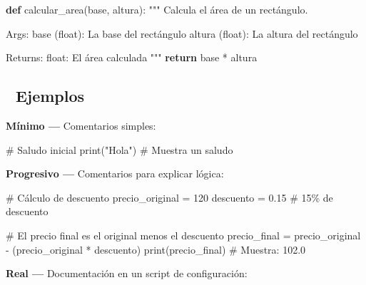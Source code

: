 \documentclass[
  doc,
  floatsintext,
  longtable,
  a4paper,
  nolmodern,
  notxfonts,
  notimes,
  12pt,
  colorlinks=true,linkcolor=blue,citecolor=blue,urlcolor=blue]{apa7}
\newenvironment{Shaded}{\begin{snugshade}}{\end{snugshade}}
\newcommand{\BuiltInTok}[1]{\textcolor[rgb]{0.00,0.23,0.31}{#1}}
\newcommand{\CommentTok}[1]{\textcolor[rgb]{0.37,0.37,0.37}{#1}}
\newcommand{\ControlFlowTok}[1]{\textcolor[rgb]{0.00,0.23,0.31}{\textbf{#1}}}
\newcommand{\DecValTok}[1]{\textcolor[rgb]{0.68,0.00,0.00}{#1}}
\newcommand{\FloatTok}[1]{\textcolor[rgb]{0.68,0.00,0.00}{#1}}
\newcommand{\KeywordTok}[1]{\textcolor[rgb]{0.00,0.23,0.31}{\textbf{#1}}}
\newcommand{\NormalTok}[1]{\textcolor[rgb]{0.00,0.23,0.31}{#1}}
\newcommand{\OperatorTok}[1]{\textcolor[rgb]{0.37,0.37,0.37}{#1}}
\newcommand{\StringTok}[1]{\textcolor[rgb]{0.13,0.47,0.30}{#1}}
\begin{document}
\begin{Shaded}
\begin{Highlighting}[]
\KeywordTok{def}\NormalTok{ calcular\_area(base, altura):}
    \CommentTok{"""}
\CommentTok{    Calcula el área de un rectángulo.}

\CommentTok{    Args:}
\CommentTok{        base (float): La base del rectángulo}
\CommentTok{        altura (float): La altura del rectángulo}

\CommentTok{    Returns:}
\CommentTok{        float: El área calculada}
\CommentTok{    """}
    \ControlFlowTok{return}\NormalTok{ base }\OperatorTok{*}\NormalTok{ altura}
\end{Highlighting}
\end{Shaded}

\subsection{🔬 Ejemplos}\label{ejemplos}

\textbf{Mínimo ---} Comentarios simples:

\begin{Shaded}
\begin{Highlighting}[]
\CommentTok{\# Saludo inicial}
\BuiltInTok{print}\NormalTok{(}\StringTok{"Hola"}\NormalTok{)  }\CommentTok{\# Muestra un saludo}
\end{Highlighting}
\end{Shaded}

\textbf{Progresivo ---} Comentarios para explicar lógica:

\begin{Shaded}
\begin{Highlighting}[]
\CommentTok{\# Cálculo de descuento}
\NormalTok{precio\_original }\OperatorTok{=} \DecValTok{120}
\NormalTok{descuento }\OperatorTok{=} \FloatTok{0.15}  \CommentTok{\# 15\% de descuento}

\CommentTok{\# El precio final es el original menos el descuento}
\NormalTok{precio\_final }\OperatorTok{=}\NormalTok{ precio\_original }\OperatorTok{{-}}\NormalTok{ (precio\_original }\OperatorTok{*}\NormalTok{ descuento)}
\BuiltInTok{print}\NormalTok{(precio\_final)  }\CommentTok{\# Muestra: 102.0}
\end{Highlighting}
\end{Shaded}

\textbf{Real ---} Documentación en un script de configuración:
\end{document}

